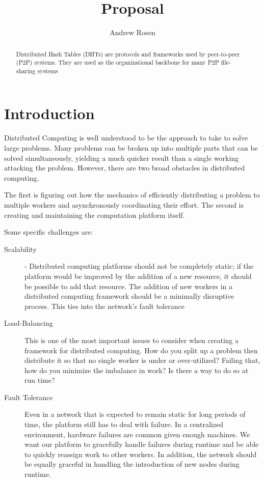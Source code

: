\documentclass[10pt,letterpaper,twoside]{report}
\title{Proposal}
\author{Andrew Rosen}
\begin{document}
\maketitle
\setcounter{tocdepth}{4}
\tableofcontents
\newpage

\begin{abstract}
Distributed Hash Tables (DHTs) are protocols and frameworks used by peer-to-peer (P2P) systems.
They are used as the organizational backbone for many P2P file-sharing systems 
\end{abstract}

\chapter{Introduction}


Distributed Computing is well understood to be the approach to take to solve large problems.  
Many problems can be broken up into multiple parts that can be solved simultaneously, yielding a much quicker result than a single working attacking the problem.
However, there are two broad obstacles in distributed computing.

The first is figuring out how the mechanics of efficiently distributing a problem to multiple workers and asynchronously coordinating their effort.  
The second is creating and maintaining the computation platform itself.


Some specific challenges are:
\begin{description}
	\item[Scalability] - Distributed computing platforms should not be completely static; if the platform would be improved by the addition of a new resource, it should be possible to add that resource.  
	The addition of new workers in a distributed computing framework should be a minimally disruptive process.
    This ties into the network's fault tolerance
	\item[Load-Balancing]  This is one of the most important issues to consider when creating a framework for distributed computing. 
    How do you split up a problem then distribute it so that no single worker is under or over-utilized?
    Failing that, how do you minimize the imbalance in work?
    Is there a way to do so at run time?
    \item[Fault Tolerance]  Even in a network that is expected to remain static for long periods of time, the platform still has to deal with failure.  
    In a centralized environment, hardware failures are common given enough machines.
    We want our platform to gracefully handle failures during runtime and be able to quickly reassign work to other workers.
    In addition, the network should be equally graceful in handling the introduction of new nodes during runtime.
\end{description}
\end{document}
